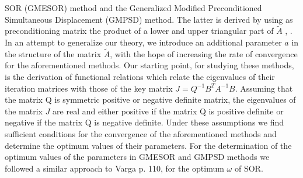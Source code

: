 \documentclass{report}
\begin{document}
SOR (GMESOR) method and the Generalized Modified Preconditioned
Simultaneous Displacement (GMPSD) method. The latter is derived by using
as preconditioning matrix the product of a lower and upper triangular
part of $\tilde A$ \cite{Louka}, \cite{LoukMis2}.
In an attempt to generalize our theory, we introduce an additional
parameter $a$ in the structure of the matrix $\tilde A$, with the hope of
increasing the rate of convergence for the aforementioned methods. Our
starting point, for studying these methods, is the derivation of
functional relations which relate the eigenvalues of their iteration
matrices with those of the key matrix $J=Q^{-1}B^TA^{-1}B$. Assuming that
the matrix Q is symmetric positive or negative definite matrix, the
eigenvalues of the matrix $J$ are real and either positive if the matrix
Q is positive definite or negative if the matrix Q is negative definite.
Under these assumptions we find sufficient conditions for the convergence
of the aforementioned methods and determine the optimum values of their
parameters. For the determination of the optimum values of the parameters
in GMESOR and GMPSD methods we followed a similar approach to Varga
\cite{Var1} p. 110, for the optimum $\omega$ of SOR.
\end{document}
